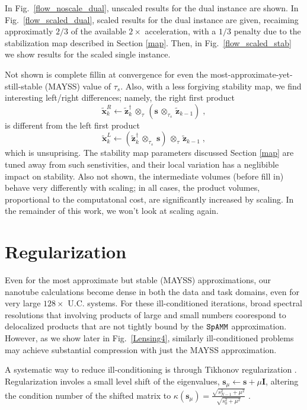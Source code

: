 \documentclass[letterpaper,twocolumn,amsmath,amsfont,amssymb,english,aps,jcp,preprintnumbers,groupaddress,nofootinbib,tightenlines,floatfix]{revtex4}
\newcommand{\mat}[1]{\boldsymbol{#1}}
\newcommand{\ot}{  {\scriptstyle \otimes}_{ \tau } }
\newcommand{\ots}{ {\scriptstyle \otimes}_{ \! \tau_s } }
\theoremstyle{plain}
\theoremstyle{remark}
\theoremstyle{plain}
\begin{document}
In Fig.~\ref{flow_noscale_dual}, unscaled results for the dual instance are shown.  In Fig.~\ref{flow_scaled_dual}, scaled results for the
dual instance are given, recaiming approximatly $2/3$ of the available $2 \times$ acceleration, with a $1/3$ penalty due to the
stabilization map described in Section \ref{map}. Then, in Fig.~\ref{flow_scaled_stab} we show results for the scaled single instance. 

Not shown is complete fillin at convergence for even the most-approximate-yet-still-stable (MAYSS) value of $\tau_s$.  
Also, with a less forgiving stability map, we find interesting 
left/right differences;  namely, the right first product 
\begin{equation} 
\widetilde{\mat{x}}^R_k \leftarrow \widetilde{\mat{z}}^\dagger_{k} \, \ot  \, \left( \mat{s} \,  \ots \, \widetilde{\mat{z}}_{k-1}  \right) \; ,
\end{equation}
is  different from the left first product 
\begin{equation} 
\widetilde{\mat{x}}^L_k \leftarrow \left(  \widetilde{\mat{z}}^\dagger_{k} \, \ots \, \mat{s} \right) \,  \ot  \, \widetilde{\mat{z}}_{k-1} \; ,
\end{equation}
which is unsuprising. The stability map parameters discussed Section \ref{map} 
are tuned away from such senstivities, and their local variation has a neglibible impact on stability.  
Also not shown, the intermediate volumes (before fill in) behave very differently with scaling; in all cases, the product volumes,
proportional to the computatonal cost, are significantly increased by scaling.  In the remainder of this work, we won't look at scaling again.

\section{Regularization}\label{regularization}

Even for the most approximate but stable (MAYSS) approximations, our nanotube calculations become dense in both the data and task domains, 
even for very large $128 \times$ U.C. systems.  For these ill-conditioned iterations, broad spectral resolutions that involving products of 
large and small numbers coorespond to delocalized products that are not tightly bound by the $\tt SpAMM$ approximation.   However, as 
we show later in Fig.~\ref{Lensing4}, similarly ill-conditioned problems may achieve substantial compression with just the MAYSS 
approximation. 

A systematic way to reduce ill-conditioning is through Tikhonov regularization \cite{}.
Regularization involes a small level shift of the eigenvalues,  $\mat{s}_\mu \leftarrow \mat{s}+\mu \mat{I}$, altering the 
condition number of the shifted matrix to  $\kappa( \mat{s}_\mu) = \frac{\sqrt{s^2_{N-1} + \mu^2}}{\sqrt{s^2_0+\mu^2}}$ \cite{}.
\end{document}
